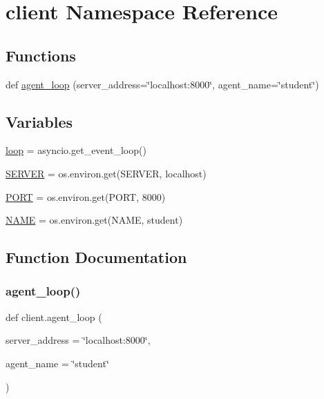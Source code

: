 \hypertarget{namespaceclient}{}\section{client Namespace Reference}
\label{namespaceclient}
\subsection*{Functions}
\begin{DoxyCompactItemize}
\item 
def \hyperlink{namespaceclient_a5e7a7d1cac558ae0908a45d86e380d50}{agent\+\_\+loop} (server\+\_\+address=\char`\"{}localhost\+:8000\char`\"{}, agent\+\_\+name=\char`\"{}student\char`\"{})
\end{DoxyCompactItemize}
\subsection*{Variables}
\begin{DoxyCompactItemize}
\item 
\hyperlink{namespaceclient_a810948a354be8c63c3b5d1dcb798952f}{loop} = asyncio.\+get\+\_\+event\+\_\+loop()
\item 
\hyperlink{namespaceclient_aa9b569c725ec0e5489583981bed1053b}{S\+E\+R\+V\+ER} = os.\+environ.\+get(\textquotesingle{}S\+E\+R\+V\+ER\textquotesingle{}, \textquotesingle{}localhost\textquotesingle{})
\item 
\hyperlink{namespaceclient_a086ed02a212b2c050873b878ee0d0827}{P\+O\+RT} = os.\+environ.\+get(\textquotesingle{}P\+O\+RT\textquotesingle{}, \textquotesingle{}8000\textquotesingle{})
\item 
\hyperlink{namespaceclient_a6c861fbb2dc4c31e5debbc785af611ef}{N\+A\+ME} = os.\+environ.\+get(\textquotesingle{}N\+A\+ME\textquotesingle{}, \textquotesingle{}student\textquotesingle{})
\end{DoxyCompactItemize}


\subsection{Function Documentation}
\mbox{\label{namespaceclient_a5e7a7d1cac558ae0908a45d86e380d50}} 
\subsubsection{\texorpdfstring{agent\+\_\+loop()}{agent\_loop()}}
{\footnotesize\ttfamily def client.\+agent\+\_\+loop (\begin{DoxyParamCaption}\item[{}]{server\+\_\+address = {\ttfamily \char`\"{}localhost\+:8000\char`\"{}},  }\item[{}]{agent\+\_\+name = {\ttfamily \char`\"{}student\char`\"{}} }\end{DoxyParamCaption})}



